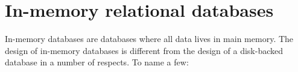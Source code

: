 \section{In-memory relational databases}

In-memory databases are databases where all data lives in main
memory. The design of in-memory databases is different from the design
of a disk-backed database in a number of respects. To name a few:

